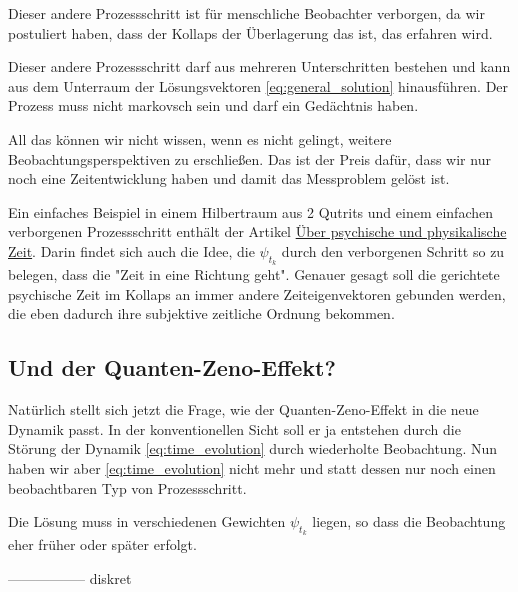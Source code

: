 \documentclass[12pt]{article}
\begin{document}
Dieser andere Prozessschritt ist für menschliche Beobachter verborgen, da wir postuliert haben, dass der Kollaps der Überlagerung das ist, das erfahren wird. 

Dieser andere Prozessschritt darf aus mehreren Unterschritten bestehen und kann aus dem Unterraum der Lösungsvektoren \eqref{eq:general_solution} hinausführen. Der Prozess muss nicht markovsch sein und darf ein Gedächtnis haben.

All das können wir nicht wissen, wenn es nicht gelingt, weitere Beobachtungsperspektiven zu erschließen. Das ist der Preis dafür, dass wir nur noch eine Zeitentwicklung haben und damit das Messproblem gelöst ist.

Ein einfaches Beispiel in einem Hilbertraum aus 2 Qutrits und einem einfachen verborgenen Prozessschritt enthält der Artikel \href{http://vermaschung.de/index.php?title=Warum_Panpsychismus%3F}{Über psychische und physikalische Zeit}. Darin findet sich auch die Idee, die $\psi_{t_k}$ durch den verborgenen Schritt so zu belegen, dass die "Zeit in eine Richtung geht". Genauer gesagt soll die gerichtete psychische Zeit im Kollaps an immer andere Zeiteigenvektoren gebunden werden, die eben dadurch ihre subjektive zeitliche Ordnung bekommen.

\subsection{Und der Quanten-Zeno-Effekt?}

Natürlich stellt sich jetzt die Frage, wie der Quanten-Zeno-Effekt in die neue Dynamik passt. In der konventionellen Sicht soll er ja entstehen durch die Störung der Dynamik \eqref{eq:time_evolution} durch wiederholte Beobachtung. Nun haben wir aber \eqref{eq:time_evolution} nicht mehr und statt dessen nur noch einen beobachtbaren Typ von Prozessschritt.

Die Lösung muss in verschiedenen Gewichten $\psi_{t_k}$ liegen, so dass die Beobachtung eher früher oder später erfolgt.

-----------------
diskret
\end{document}

